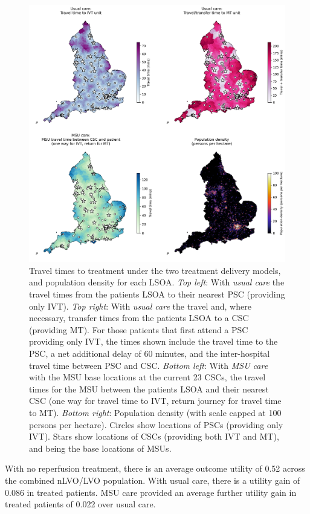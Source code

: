 \begin{figure}[h!]
    \centering
    \includegraphics[width=1.0\linewidth]{images/map_times.jpg}
    \caption{Travel times to treatment under the two treatment delivery models, and population density for each LSOA. \textit{Top left}: With \emph{usual care} the travel times from the patients LSOA to their nearest PSC (providing only IVT). \textit{Top right}: With \emph{usual care} the travel and, where necessary, transfer times from the patients LSOA to a CSC (providing MT). For those patients that first attend a PSC providing only IVT, the times shown include the travel time to the PSC, a net additional delay of 60 minutes, and the inter-hospital travel time between PSC and CSC. \textit{Bottom left}: With \emph{MSU care} with the MSU base locations at the current 23 CSCs, the travel times for the MSU between the patients LSOA and their nearest CSC (one way for travel time to IVT, return journey for travel time to MT). \textit{Bottom right}: Population density (with scale capped at 100 persons per hectare). Circles show locations of PSCs (providing only IVT). Stars show locations of CSCs (providing both IVT and MT), and being the base locations of MSUs.}
    \label{fig:map_times}
\end{figure}

With no reperfusion treatment, there is an average outcome utility of 0.52 across the combined nLVO/LVO population. With usual care, there is a utility gain of 0.086 in treated patients. MSU care provided an average further utility gain in treated patients of 0.022 over usual care.

